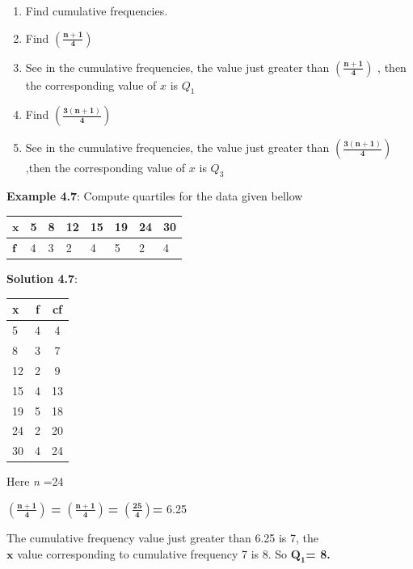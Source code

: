 \documentclass[
]{book}
\begin{document}
\begin{enumerate}
\def\labelenumi{\arabic{enumi}.}
\item
  Find cumulative frequencies.
\item
  Find \(\left( \frac{\mathbf{n + 1}}{\mathbf{4}} \right)\)
\item
  See in the cumulative frequencies, the value just greater than
  \(\left( \frac{\mathbf{n + 1}}{\mathbf{4}} \right)\) , then the
  corresponding value of \(x\) is \(Q_{1}\)
\item
  Find \(\left( \frac{\mathbf{3(n + 1)}}{\mathbf{4}} \right)\)
\item
  See in the cumulative frequencies, the value just greater than
  \(\left( \frac{\mathbf{3(n + 1)}}{\mathbf{4}} \right)\) ,then the
  corresponding value of \(x\) is \(Q_{3}\)
\end{enumerate}

\textbf{Example 4.7}: Compute quartiles for the data given bellow

\begin{longtable}[]{@{}llllllll@{}}
\toprule
\(\mathbf{x}\) & 5 & 8 & 12 & 15 & 19 & 24 & 30 \\
\midrule
\endhead
\(\mathbf{f}\) & 4 & 3 & 2 & 4 & 5 & 2 & 4 \\
\bottomrule
\end{longtable}

\textbf{Solution 4.7}:

\begin{longtable}[]{@{}lcc@{}}
\toprule
x & f & cf \\
\midrule
\endhead
5 & 4 & 4 \\
8 & 3 & 7 \\
12 & 2 & 9 \\
15 & 4 & 13 \\
19 & 5 & 18 \\
24 & 2 & 20 \\
30 & 4 & 24 \\
\bottomrule
\end{longtable}

Here \emph{n} =24

\(\left( \frac{\mathbf{n + 1}}{\mathbf{4}} \right)\) \textbf{=}
\(\left( \frac{\mathbf{n + 1}}{\mathbf{4}} \right)\mathbf{\ }\)\textbf{=}
\(\left( \frac{\mathbf{25}}{\mathbf{4}} \right)\)\textbf{=} 6.25

The cumulative frequency value just greater than 6.25 is 7, the\\
\(\mathbf{x}\) value corresponding to cumulative frequency 7 is 8. So
\(\mathbf{Q}_{\mathbf{1}}\)\textbf{= 8.}
\end{document}
